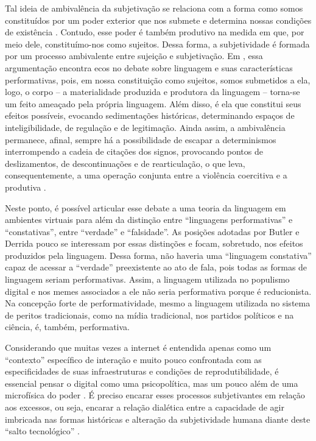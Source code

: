 \documentclass[portuguese]{textolivre}
\begin{document}
Tal ideia de ambivalência da subjetivação se relaciona com a forma como somos constituídos por um poder exterior que nos submete e determina nossas condições de existência \cite{butler2017vida}. Contudo, esse poder é também produtivo na medida em que, por meio dele, constituímo-nos como sujeitos. Dessa forma, a subjetividade é formada por um processo ambivalente entre sujeição e subjetivação. Em \textcite{butler1997excitable}, essa argumentação encontra ecos no debate sobre linguagem e suas características performativas, pois, em nossa constituição como sujeitos, somos submetidos a ela, logo, o corpo – a materialidade produzida e produtora da linguagem – torna-se um feito ameaçado pela própria linguagem. Além disso, é ela que constitui seus efeitos possíveis, evocando sedimentações históricas, determinando espaços de inteligibilidade, de regulação e de legitimação. Ainda assim, a ambivalência permanece, afinal, sempre há a possibilidade de escapar a determinismos interrompendo a cadeia de citações dos signos, provocando pontos de deslizamentos, de descontinuações e de rearticulação, o que leva, consequentemente, a uma operação conjunta entre a violência coercitiva e a produtiva \cite{pinto2009corpo}.

Neste ponto, é possível articular esse debate a uma teoria da linguagem em ambientes virtuais para além da distinção entre “linguagens performativas” e “constativas”, entre “verdade” e “falsidade”. As posições adotadas por Butler e Derrida pouco se interessam por essas distinções e focam, sobretudo, nos efeitos produzidos pela linguagem. Dessa forma, não haveria uma “linguagem constativa” capaz de acessar a “verdade” preexistente ao ato de fala, pois todas as formas de linguagem seriam performativas. Assim, a linguagem utilizada no populismo digital e nos memes associados a ele não seria performativa porque é reducionista. Na concepção forte de performatividade, mesmo a linguagem utilizada no sistema de peritos tradicionais, como na mídia tradicional, nos partidos políticos e na ciência, é, também, performativa.

Considerando que muitas vezes a internet é entendida apenas como um “contexto” específico de interação e muito pouco confrontada com as especificidades de suas infraestruturas e condições de reprodutibilidade, é essencial pensar o digital como uma psicopolítica, mas um pouco além de uma microfísica do poder \cite{han2023psicopolitica}. É preciso encarar esses processos subjetivantes em relação aos excessos, ou seja, encarar a relação dialética entre a capacidade de agir imbricada nas formas históricas e alteração da subjetividade humana diante deste “salto tecnológico” \cite[p. 153]{faustino2023colonialismo}.
\end{document}
